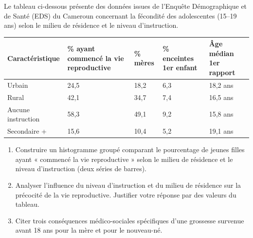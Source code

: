 \documentclass[11pt]{article}
\begin{document}
\begin{exercice}
Le tableau ci-dessous présente des données issues de l'Enquête Démographique et de Santé (EDS) du Cameroun concernant la fécondité des adolescentes (15--19 ans) selon le milieu de résidence et le niveau d'instruction.

\begin{tabularx}{\linewidth}{lXXXX}
\toprule
\textbf{Caractéristique} & \textbf{\% ayant commencé la vie reproductive} & \textbf{\% mères} & \textbf{\% enceintes 1er enfant} & \textbf{Âge médian 1er rapport} \\
\midrule
Urbain & 24,5 & 18,2 & 6,3 & 18,2 ans \\
Rural & 42,1 & 34,7 & 7,4 & 16,5 ans \\
Aucune instruction & 58,3 & 49,1 & 9,2 & 15,8 ans \\
Secondaire + & 15,6 & 10,4 & 5,2 & 19,1 ans \\
\bottomrule
\end{tabularx}

\begin{enumerate}
    \item Construire un histogramme groupé comparant le pourcentage de jeunes filles ayant « commencé la vie reproductive » selon le milieu de résidence et le niveau d'instruction (deux séries de barres).
    \item Analyser l'influence du niveau d'instruction et du milieu de résidence sur la précocité de la vie reproductive. Justifier votre réponse par des valeurs du tableau.
    \item Citer trois conséquences médico-sociales spécifiques d'une grossesse survenue avant 18 ans pour la mère et pour le nouveau-né.
\end{enumerate}
\end{exercice}
\end{document}
